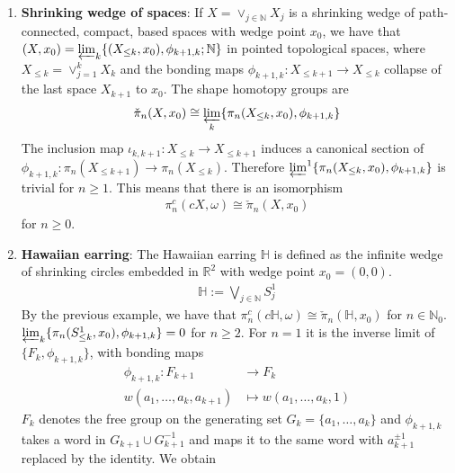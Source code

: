 \documentclass[a4paper,11pt]{article}
\theoremstyle{definition}
\theoremstyle{plain}
\theoremstyle{remark}
\begin{document}
{\begin{enumerate}
\[ \pi_{n}^{c}(c\Lambda,\omega) \cong \begin{cases} 
        0 & n\geq1 \\ 
        \mathbb{R} & n=0\\
       \end{cases}
    \]



\item \textbf{Shrinking wedge of spaces}: If $X = \vee_{j\in \mathbb{N}} X_{j}$ is a shrinking wedge of path-connected, compact, based spaces with wedge point $x_0$, we have that $(X,x_0) = \varprojlim_{k} \{(X_{\leq k},x_0), \phi_{k+1,k};\mathbb{N}\}$ in pointed topological spaces, where  $X_{\leq k} = \vee_{j=1}^{k}X_k$ and the bonding maps $\phi_{k+1,k}: X_{\leq k+1}\rightarrow X_{\leq k}$ collapse of the last space $X_{k+1}$ to $x_0$. The shape homotopy groups are
\begin{align*}
\check{\pi}_{n}(X,x_0) \cong \varprojlim_{k} \{\pi_{n}(X_{\leq k},x_0), \phi_{k+1,k}\}
\end{align*}
The inclusion map $\iota_{k,k+1}: X_{\leq k}\rightarrow X_{\leq k+1}$ induces a canonical section of $\phi_{k+1,k}: \pi_{n}(X_{\leq k+1})\rightarrow \pi_{n}(X_{\leq k})$. Therefore $\varprojlim^1 \{\pi_{n}(X_{\leq k},x_0), \phi_{k+1,k}\}$ is trivial for $n\geq 1$. This means that there is an isomorphism 
\begin{align*}
\pi_{n}^{c}(cX,\omega)\cong \check{\pi}_{n}(X,x_0)
\end{align*}
for $n\geq 0$. 


\item \textbf{Hawaiian earring}: The Hawaiian earring $\mathbb{H}$ is defined as the infinite wedge of shrinking circles embedded in $\mathbb{R}^2$ with wedge point $x_0 = (0,0)$. 
\begin{align*}
\mathbb{H}:= \bigvee _{j\in \mathbb{N}} S^1_{j}
\end{align*}
By the previous example, we have that $\pi_{n}^{c}(c\mathbb{H},\omega)\cong \check{\pi}_{n}(\mathbb{H},x_0)$ for $n\in \mathbb{N}_{0}$. \\

$\varprojlim_{k} \{\pi_{n}(S^{1}_{\leq k},x_0), \phi_{k+1,k}\} = 0$ for $n\geq 2$. For $n=1$ it is the inverse limit of $\{F_{k},\phi_{k+1,k}\}$, with bonding maps 
\begin{align*}
\phi_{k+1,k}: F_{k+1}&\rightarrow F_{k}\\
w(a_1,\dots,a_k, a_{k+1}) &\mapsto w(a_1,\dots,a_k,1)
\end{align*} 
$F_{k}$ denotes the free group on the generating set $G_{k} = \{a_{1},\dots,a_{k}\}$ and $\phi_{k+1,k}$ takes a word in $G_{k+1}\cup G_{k+1}^{-1}$ and maps it to the same word with $a_{k+1}^{\pm 1}$ replaced by the identity. We obtain



\end{enumerate}}
\end{document}

